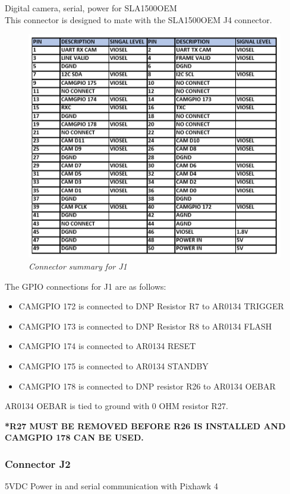 \documentclass[11pt]{article}
\begin{document}
Digital camera, serial, power for SLA1500OEM
\\
This connector is designed to mate with the SLA1500OEM J4 connector. 

    \begin{figure}[H]
	\centering	
	\includegraphics[width=6 in]{CONN_J1}
	\caption{\textit{Connector summary for J1}}	
	\end{figure}

 The GPIO connections for J1 are as follows:

\begin{itemize}

\item CAMGPIO 172 is connected to DNP Resistor R7 to AR0134 TRIGGER
\item CAMGPIO 173  is connected to DNP Resistor R8 to AR0134 FLASH
\item CAMGPIO 174  is connected to AR0134 RESET
\item CAMGPIO 175  is connected to AR0134 STANDBY
\item CAMGPIO 178 is connected to DNP resistor R26 to AR0134 OEBAR
\end{itemize}

AR0134 OEBAR is tied to ground with 0 OHM resistor R27.

\textbf{*R27  MUST BE REMOVED BEFORE R26 IS INSTALLED AND CAMGPIO 178 CAN BE USED.}

\subsubsection{Connector J2}
5VDC Power in and serial communication with Pixhawk 4
\end{document}
